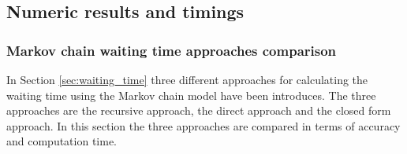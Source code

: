\subsection{Numeric results and timings}\label{sec:truncation_effect}



\subsubsection{Markov chain waiting time approaches comparison}
\label{sec:waiting_time_approach_comparison}

In Section \ref{sec:waiting_time} three different approaches for calculating
the waiting time using the Markov chain model have been introduces.
The three approaches are the recursive approach, the direct approach and
the closed form approach.
In this section the three approaches are compared in terms of accuracy and
computation time.



    



